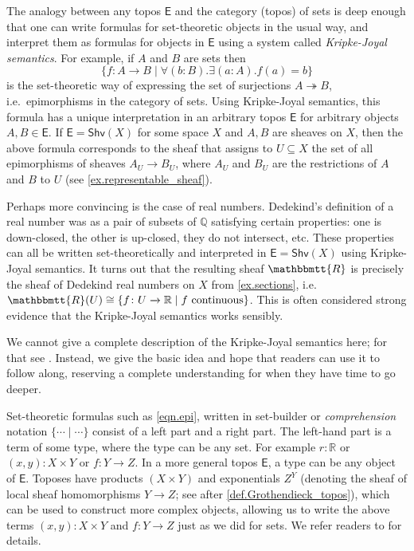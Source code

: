\documentclass[reqno,11pt]{amsproc}
\theoremstyle{plain}
\theoremstyle{definition}
\newcommand{\cat}[1]{\mathsf{#1}}
\renewcommand{\to}[1][]{\xrightarrow{#1}}
\newcommand{\surj}{\twoheadrightarrow}
\newcommand{\tn}[1]{\textnormal{#1}}
\newcommand{\internal}[1]{\raisebox{-.03ex}{$\mathbbmtt{#1}$}}
\newcommand{\qq}{\mathbb{Q}}
\newcommand{\rr}{\mathbb{R}}
\newcommand{\trr}{\internal{R}}
\newcommand{\shv}{\cat{Shv}}
\numberwithin{equation}{section}
\begin{document}
The analogy between any topos $\cat{E}$ and the category (topos) of sets is deep enough that one can write formulas for set-theoretic objects in the usual way, and interpret them as formulas for objects in $\cat{E}$ using a system called \emph{Kripke-Joyal semantics}. For example, if $A$ and $B$ are sets then 
\begin{equation}\label{eqn.epi}
\{f\colon A\to B\mid \forall (b:B).\exists(a:A). f(a)=b\}
\end{equation}
is the set-theoretic way of expressing the set of surjections $A\surj B$, i.e.\ epimorphisms in the category of sets. Using Kripke-Joyal semantics, this formula has a unique interpretation in an arbitrary topos $\cat{E}$ for arbitrary objects $A,B\in\cat{E}$. If $\cat{E}=\shv(X)$ for some space $X$ and $A,B$ are sheaves on $X$, then the above formula corresponds to the sheaf that assigns to $U\subseteq X$ the set of all epimorphisms of sheaves $A_U\to B_U$, where $A_U$ and $B_U$ are the restrictions of $A$ and $B$ to $U$ (see \cref{ex.representable_sheaf}).

Perhaps more convincing is the case of real numbers. Dedekind's definition of a real number was as a pair of subsets of $\qq$ satisfying certain properties: one is down-closed, the other is up-closed, they do not intersect, etc. These properties can all be written set-theoretically and interpreted in $\cat{E}=\shv(X)$ using Kripke-Joyal semantics. It turns out that the resulting sheaf $\trr$ is precisely the sheaf of Dedekind real numbers on $X$ from \cref{ex.sections}, i.e.\ $\trr(U)\cong\{f\colon U\to\rr\mid f\tn{ continuous}\}$. This is often considered strong evidence that the Kripke-Joyal semantics works sensibly.

We cannot give a complete description of the Kripke-Joyal semantics here; for that see \cite{MacLane.Moerdijk:1992a}. Instead, we give the basic idea and hope that readers can use it to follow along, reserving a complete understanding for when they have time to go deeper.

Set-theoretic formulas such as \eqref{eqn.epi}, written in set-builder or \emph{comprehension} notation $\{\cdots\mid\cdots\}$ consist of a left part and a right part. The left-hand part is a term of some type, where the type can be any set. For example $r:\rr$ or $(x,y): X\times Y$ or $f:Y\to Z$. In a more general topos $\cat{E}$, a type can be any object of $\cat{E}$. Toposes have products $(X\times Y)$ and exponentials $Z^Y$ (denoting the sheaf of local sheaf homomorphisms $Y\to Z$; see after \cref{def.Grothendieck_topos}), which can be used to construct more complex objects, allowing us to write the above terms $(x,y):X\times Y$ and $f:Y\to Z$ just as we did for sets. We refer readers to \cite[Section VI.5]{MacLane.Moerdijk:1992a} for details.
\end{document}
